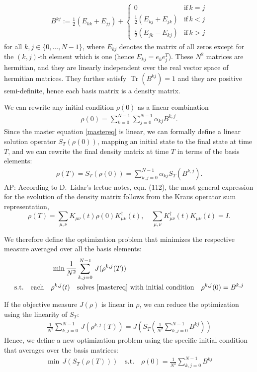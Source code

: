 \documentclass[letterpaper]{article}
\DeclareMathOperator{\Tr}{Tr}
\begin{document}
\begin{align}
B^{kj} := \frac 12 \left( E_{kk} + E_{jj}\right) +  \begin{cases} 
          0 & \text{if} \, k=j \\ 
        \frac 12 \left( E_{kj} + E_{jk}\right) & \text{if} \, k<j \\
        \frac i2 \left( E_{jk} - E_{kj}\right) & \text{if} \, k>j
      \end{cases} 
\end{align}
for all $k,j\in\{0,\dots, N-1\}$, where $E_{kj}$ denotes the matrix of all zeros except for the $(k,j)$-th element which is one (hence $E_{kj} = e_ke_j^T$). These $N^2$ matrices are hermitian, and they are linearly independent over the real vector space of hermitian matrices. They further satisfy $\Tr(B^{kj}) = 1$ and they are positive semi-definite, hence each basis matrix is a density matrix. 

We can rewrite any initial condition $\rho(0)$ as a linear combination 
\begin{align}
  \rho(0) = \sum_{k=0}^{N-1} \sum_{j=0}^{N-1} \alpha_{kj} B^{k, j}.
\end{align}
Since the master equation \eqref{mastereq} is linear, we can formally define a linear solution operator $S_T(\rho(0))$, mapping an initial state to the final state at time $T$, and we can rewrite the final density matrix at time $T$ in terms of the basis elements:
\begin{align}
  \rho(T) = S_T(\rho(0)) = \sum_{k,j=0}^{N-1} \alpha_{kj} S_T(B^{k, j}).
\end{align}
AP: According to D.~Lidar's lectue notes, eqn. (112), the most general expression for the evolution
of the density matrix follows from the Kraus operator sum representation,
\[
  \rho(T) = \sum_{\mu,\nu} K_{\mu\nu}(t) \rho(0) K_{\mu\nu}^\dagger(t),\quad \sum_{\mu,\nu}
  K_{\mu\nu}^\dagger(t)K_{\mu\nu}(t)=I.
\]

We therefore define the optimization problem that minimizes the respective measure averaged over all the basis elements:
\begin{align}\label{optimproblem_basis}
  \min \frac{1}{N^2} & \sum_{k,j=0}^{N-1} \, J(\rho^{k,j}(T))  \\
  \text{s.t.} \quad  \text{each} \quad \rho^{k,j}(t) \quad & \text{solves \eqref{mastereq} with initial condition} \quad \rho^{k,j}(0) = B^{k,j}
\end{align}

If the objective measure $J(\rho)$ is linear in $\rho$, we can reduce the optimization using the linearity of $S_T$:
\begin{align}
   \frac{1}{N^2}  \sum_{k,j=0}^{N-1} \, J\left(\rho^{k,j}(T)\right) = J\left(S_T\left(\frac{1}{N^2}  \sum_{k,j=0}^{N-1} B^{kj}\right)\right)
\end{align}
Hence, we define a new optimization problem using the specific initial condition that averages over the basis matrices:
\begin{align}
  \min \, J(S_T(\rho(T))) \quad \text{s.t.} \quad \rho(0) = \frac{1}{N^2}  \sum_{k,j=0}^{N-1} B^{kj}
\end{align}
\end{document}

